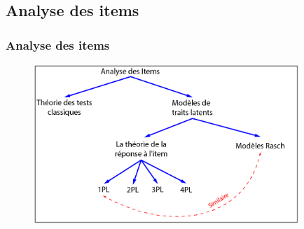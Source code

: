 \documentclass[aspectratio=169,professionalfonts, 12pt]{beamer}
\begin{document}
\subsection{Analyse des items}

\begin{frame}
  \frametitle{Analyse des items}
  \justifying 
  \begin{minipage}{\textwidth}
  \begin{figure}[H]
      \includegraphics[height=6cm]{images/etat_art/items_analysis.png}
  \end{figure}
  \end{minipage}
\end{frame}


\end{document}
